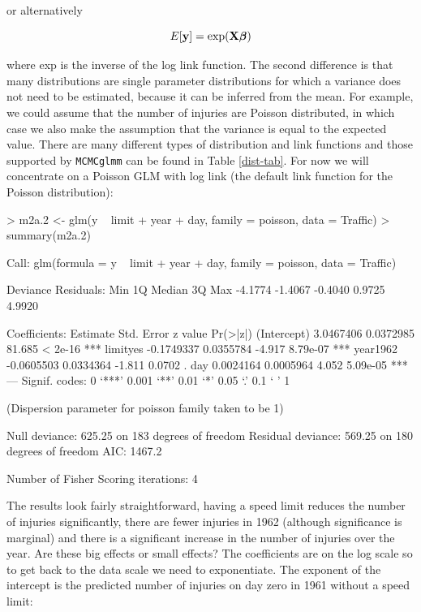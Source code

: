 \documentclass{article}
\begin{document}
or alternatively

\begin{equation}
E[{\bf y}] = \textrm{exp}({\bf X}{\bm \beta})
\end{equation}

where \textrm{exp} is the inverse of the log link function. The second difference is that many distributions are single parameter distributions for which a variance does not need to be estimated, because it can be inferred from the mean. For example, we could assume that the number of injuries are Poisson distributed, in which case we also make the assumption that the variance is equal to the expected value.  There are many different types of distribution and link functions and those supported by \texttt{MCMCglmm} can be found in Table \ref{dist-tab}. For now we will concentrate on a Poisson GLM with log link (the default link function for the Poisson distribution):

\begin{Schunk}
\begin{Sinput}
> m2a.2 <- glm(y ~ limit + year + day, family = poisson, data = Traffic)
> summary(m2a.2)
\end{Sinput}
\begin{Soutput}
Call:
glm(formula = y ~ limit + year + day, family = poisson, data = Traffic)

Deviance Residuals: 
    Min       1Q   Median       3Q      Max  
-4.1774  -1.4067  -0.4040   0.9725   4.9920  

Coefficients:
              Estimate Std. Error z value Pr(>|z|)    
(Intercept)  3.0467406  0.0372985  81.685  < 2e-16 ***
limityes    -0.1749337  0.0355784  -4.917 8.79e-07 ***
year1962    -0.0605503  0.0334364  -1.811   0.0702 .  
day          0.0024164  0.0005964   4.052 5.09e-05 ***
---
Signif. codes:  0 `***' 0.001 `**' 0.01 `*' 0.05 `.' 0.1 ` ' 1 

(Dispersion parameter for poisson family taken to be 1)

    Null deviance: 625.25  on 183  degrees of freedom
Residual deviance: 569.25  on 180  degrees of freedom
AIC: 1467.2

Number of Fisher Scoring iterations: 4
\end{Soutput}
\end{Schunk}

The results look fairly straightforward, having a speed limit reduces the number of injuries significantly, there are fewer injuries in 1962 (although significance is marginal) and there is a significant increase in the number of injuries over the year. Are these big effects or small effects? The coefficients are on the log scale so to get back to the data scale we need to exponentiate. The exponent of the intercept is the predicted number of injuries on day zero in 1961 without a speed limit:
\end{document}
